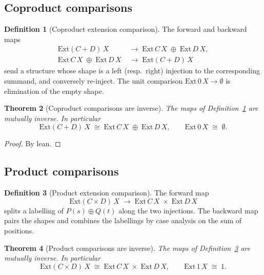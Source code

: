 \documentclass[11pt,a4paper]{article}
\theoremstyle{plain}
\newtheorem{theorem}{Theorem}[section]
\theoremstyle{definition}
\newtheorem{definition}[theorem]{Definition}
\newcommand{\Ext}{\mathrm{Ext}}
\begin{document}
\subsection{Coproduct comparisons}

\begin{definition}[Coproduct extension comparison]\label{def:coprod-ext}
The forward and backward maps
\begin{align}
  \Ext(C+D)\,X
  &\;\longrightarrow\;
  \Ext\,C\,X \;\oplus\; \Ext\,D\,X, \\
  \Ext\,C\,X \;\oplus\; \Ext\,D\,X
  &\;\longrightarrow\;
  \Ext(C+D)\,X
\end{align}
send a structure whose shape is a left (resp.\ right) injection to the
corresponding summand, and conversely re-inject. The unit comparison
$\Ext\,0\,X \to \emptyset$ is elimination of the empty shape.
\end{definition}

\begin{theorem}[Coproduct comparisons are inverse]\label{thm:coprod-ext}
The maps of Definition~\ref{def:coprod-ext} are mutually inverse. In
particular
\begin{equation}
  \Ext(C+D)\,X \;\cong\; \Ext\,C\,X \;\oplus\; \Ext\,D\,X,
  \qquad
  \Ext\,0\,X \;\cong\; \emptyset.
\end{equation}
\end{theorem}

\begin{proof}
By lean.
\end{proof}

\subsection{Product comparisons}

\begin{definition}[Product extension comparison]\label{def:prod-ext}
The forward map
\[
  \Ext(C \times D)\,X
  \;\longrightarrow\;
  \Ext\,C\,X \;\times\; \Ext\,D\,X
\]
splits a labelling of $P(s) \oplus Q(t)$ along the two injections. The
backward map pairs the shapes and combines the labellings by case
analysis on the sum of positions.
\end{definition}

\begin{theorem}[Product comparisons are inverse]\label{thm:prod-ext}
The maps of Definition~\ref{def:prod-ext} are mutually inverse. In
particular
\begin{equation}
  \Ext(C \times D)\,X \;\cong\; \Ext\,C\,X \;\times\; \Ext\,D\,X,
  \qquad
  \Ext\,1\,X \;\cong\; 1.
\end{equation}
\end{theorem}
\end{document}
